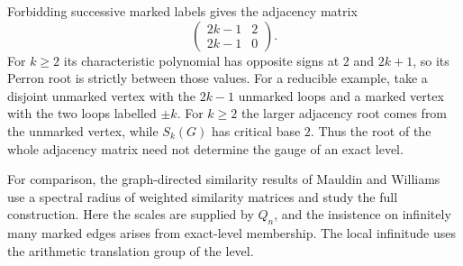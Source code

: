 \begin{remark}
Forbidding successive marked labels gives the adjacency matrix
\[
 \begin{pmatrix}2k-1&2\\2k-1&0\end{pmatrix}.
\]
For $k\ge2$ its characteristic polynomial has opposite signs at $2$
and $2k+1$, so its Perron root is strictly between those values.
For a reducible example, take a disjoint unmarked vertex with the
$2k-1$ unmarked loops and a marked vertex with the two loops labelled
$\pm k$. For $k\ge2$ the larger adjacency root comes from the unmarked
vertex, while $S_k(G)$ has critical base $2$. Thus the root of the
whole adjacency matrix need not determine the gauge of an exact level.
\end{remark}

For comparison, the graph-directed similarity results of Mauldin
and Williams \cite[Theorems~3 and~4]{MW} use a spectral radius of weighted
similarity matrices and study the full construction. Here the scales
are supplied by $Q_n$, and the insistence on infinitely many marked
edges arises from exact-level membership. The local infinitude uses
the arithmetic translation group of the level.

